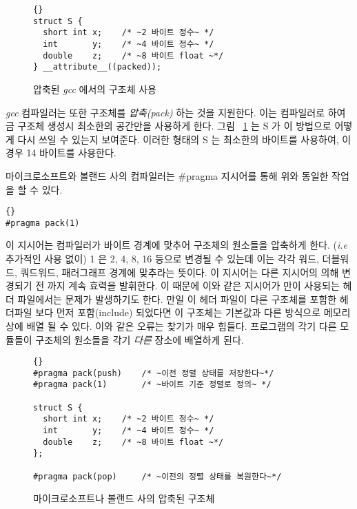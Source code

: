 \begin{figure}[t]
\begin{lstlisting}[frame=tlrb,stepnumber=0,escapeinside=~~]{}
struct S {
  short int x;    /* ~2 바이트 정수~ */
  int       y;    /* ~4 바이트 정수~ */
  double    z;    /* ~8 바이트 float ~*/
} __attribute__((packed));
\end{lstlisting}
\caption{압축된 \emph{gcc} 에서의 구조체 사용 \label{fig:packedStruct}}
\end{figure}

\emph{gcc} 컴파일러는 또한 구조체를 \emph{압축(pack)} 하는 것을 지원한다.
이는 컴파일러로 하여금 구조체 생성시 최소한의 공간만을 사용하게 한다. 그림 ~\ref{fig:packedStruct} 는
{\code S} 가 이 방법으로 어떻게 다시 쓰일 수 있는지 보여준다. 이러한 형태의 {\code S} 는 최소한의 바이트를
사용하여, 이 경우 14 바이트를 사용한다. 

마이크로소프트와 볼랜드 사의 컴파일러는 {\code \#pragma} 지시어를 통해 위와 동일한 작업을 
할 수 있다. 
\begin{lstlisting}[stepnumber=0]{}
#pragma pack(1)
\end{lstlisting}
이 지시어는 컴파일러가 바이트 경계에 맞추어 구조체의 원소들을 압축하게 한다. (\emph{i.e} 
추가적인 사용 없이) 1 은 2, 4, 8, 16 등으로 변경될 수 있는데 이는 각각 워드, 더블워드, 쿼드워드,
패러그래프 경계에 맞추라는 뜻이다. 이 지시어는 다른 지시어의 의해 변경되기 전 까지 계속 효력을
발휘한다. 이 때문에 이와 같은 지시어가 만이 사용되는 헤더 파일에서는 문제가 발생하기도 한다. 
만일 이 헤더 파일이 다른 구조체를 포함한 헤더파일 보다 먼저 포함(include) 되었다면 이 구조체는
기본값과 다른 방식으로 메모리 상에 배열 될 수 있다. 이와 같은 오류는 찾기가 매우 힘들다. 프로그램의
각기 다른 모듈들이 구조체의 원소들을 각기 \emph{다른} 장소에 배열하게 된다. 

\begin{figure}[t]
\begin{lstlisting}[frame=tlrb,stepnumber=0,escapeinside=~~]{}
#pragma pack(push)    /* ~이전 정렬 상태를 저장한다~*/
#pragma pack(1)       /* ~바이트 기준 정렬로 정의~ */

struct S {
  short int x;    /* ~2 바이트 정수~ */
  int       y;    /* ~4 바이트 정수~ */
  double    z;    /* ~8 바이트 float ~*/
};

#pragma pack(pop)     /* ~이전의 정렬 상태를 복원한다~*/
\end{lstlisting}
\caption{마이크로소프트나 볼랜드 사의 압축된 구조체 \label{fig:msPacked}}
\end{figure}

